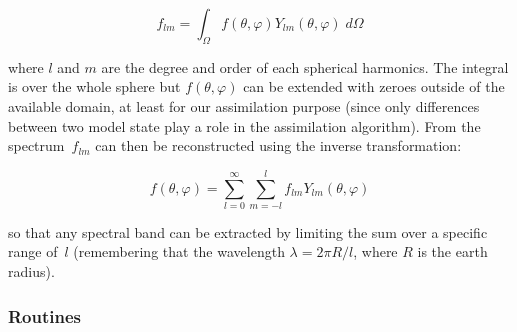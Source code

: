 \documentclass[11pt]{article}
\begin{document}
\begin{equation}
\label{eq:spect}
f_{lm} = \int_{\Omega} f(\theta,\varphi) Y_{lm}(\theta,\varphi) \; d\Omega
\end{equation}

\noindent
where $l$ and $m$ are the degree and order of each spherical harmonics.
The integral is over the whole sphere but $f(\theta,\varphi)$
can be extended with zeroes outside of the available domain,
at least for our assimilation purpose
(since only differences between two model state play a role in the assimilation algorithm).
From the spectrum~$f_{lm}$ can then be reconstructed
using the inverse transformation:

\begin{equation}
\label{eq:spect-inv}
f(\theta,\varphi) = \sum_{l=0}^\infty \sum_{m=-l}^l
                    f_{lm} Y_{lm}(\theta,\varphi)
\end{equation}

\noindent
so that any spectral band can be extracted by limiting
the sum over a specific range of~$l$
(remembering that the wavelength $\lambda=2\pi R/l$, where $R$ is the earth radius).

\subsubsection*{Routines}
\end{document}
